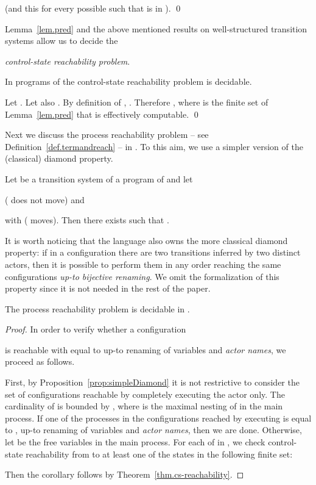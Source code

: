 \documentclass{LMCS}
\theoremstyle{plain}\newtheorem{proposition}[thm]{Proposition}
\theoremstyle{plain}\newtheorem{lemma}[thm]{Lemma}
\theoremstyle{plain}\newtheorem{theorem}[thm]{Theorem}
\theoremstyle{plain}\newtheorem{corollary}[thm]{Corollary}
\newif\ifconf \conffalse
\newif\ifcamera \camerafalse
\newcommand{\actor}{}
\newcommand{\actroba}{}
\begin{document}
(and this for every possible  such that
 is in ).
\qed
\fi

Lemma~\ref{lem.pred} and the above mentioned results
on well-structured transition systems
allow us to decide the 
\ifcamera
 \emph{control-state
reachability problem}:
given two states  and  of a well-structured transition system with well-quasi-ordering
, decide
whether there is  such that .
\else
 \emph{control-state
reachability problem}.
\fi

\begin{thm}
\label{thm.cs-reachability}
\ifcamera
In {\actroba} process reachability is decidable.
\else
In programs of {\actroba}
the control-state reachability problem is decidable.
\fi
\end{thm}

\ifconf
\else
\proof
Let . Let also
. 
By definition of , . Therefore 
, where  is the finite set of Lemma~\ref{lem.pred}
that is effectively computable. 
\qed
\fi

Next we discuss the process reachability problem -- 
see Definition~\ref{def.termandreach} -- in {\actroba}. To this aim, we use a 
simpler version of the (classical) diamond property.

\begin{prop}
\label{prop:simpleDiamond}
Let  be a transition system of a program
of {\actroba} and let

( does not move) and 

with  ( moves).
Then there exists  such that
.
\end{prop}
It is worth noticing that the language {\actor} also owns the more classical 
diamond property:
if in a configuration there are two transitions inferred by two
distinct actors, then it is possible to perform them in any order
reaching the same configurations \emph{up-to bijective renaming}.
We omit the formalization of this property since it is not needed
in the rest of the paper.

\begin{cor}
The process reachability problem
is decidable in {\actroba}.
\end{cor}

\begin{proof}
In order to verify whether a configuration 

is reachable with  equal to  up-to renaming of variables and \emph{actor names},
we  proceed as follows.

First, by Proposition~\ref{prop:simpleDiamond}
it is not restrictive to consider the set of configurations 
reachable by completely executing the actor  only.
The cardinality of  is bounded by , where  is the maximal nesting
of  in the main process. 
If one of the processes in the configurations reached by executing  is
equal to , up-to renaming of variables and \emph{actor names}, then we are done.
Otherwise, let  be the free variables in the main process.
For each of 
 in ,
we check control-state reachability
from 
 to at least one of the states
in the following finite set:

Then the corollary follows by Theorem~\ref{thm.cs-reachability}.
\end{proof}
\end{document}
